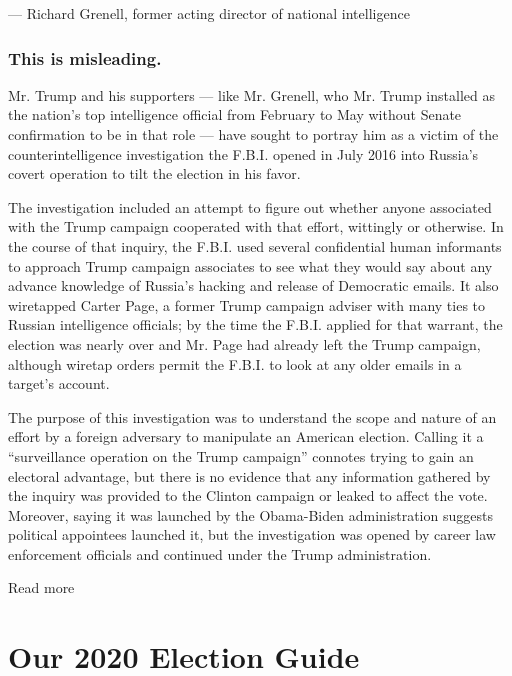 --- Richard Grenell, former acting director of national intelligence

\hypertarget{this-is-misleading-7}{%
\subsubsection{\texorpdfstring{\textbf{This is
misleading.}}{This is misleading.}}\label{this-is-misleading-7}}

Mr. Trump and his supporters --- like Mr. Grenell, who Mr. Trump
installed as the nation's top intelligence official from February to May
without Senate confirmation to be in that role --- have sought to
portray him as a victim of the counterintelligence investigation the
F.B.I. opened in July 2016 into Russia's covert operation to tilt the
election in his favor.

The investigation included an attempt to figure out whether anyone
associated with the Trump campaign cooperated with that effort,
wittingly or otherwise. In the course of that inquiry, the F.B.I. used
several confidential human informants to approach Trump campaign
associates to see what they would say about any advance knowledge of
Russia's hacking and release of Democratic emails. It also wiretapped
Carter Page, a former Trump campaign adviser with many ties to Russian
intelligence officials; by the time the F.B.I. applied for that warrant,
the election was nearly over and Mr. Page had already left the Trump
campaign, although wiretap orders permit the F.B.I. to look at any older
emails in a target's account.

The purpose of this investigation was to understand the scope and nature
of an effort by a foreign adversary to manipulate an American election.
Calling it a ``surveillance operation on the Trump campaign'' connotes
trying to gain an electoral advantage, but there is no evidence that any
information gathered by the inquiry was provided to the Clinton campaign
or leaked to affect the vote. Moreover, saying it was launched by the
Obama-Biden administration suggests political appointees launched it,
but the investigation was opened by career law enforcement officials and
continued under the Trump administration.

Read more

\hypertarget{our-2020-election-guide}{%
\section{Our 2020 Election Guide}\label{our-2020-election-guide}}

